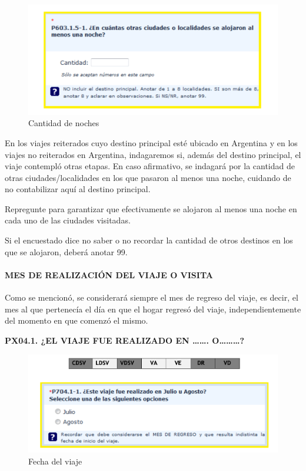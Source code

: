 \documentclass[
  openany]{book}
\begin{document}
\begin{figure}

{\centering \includegraphics[width=1\linewidth]{imagenes/figura6-85} 

}

\caption{Cantidad de noches}\label{fig:menosdeuna5}
\end{figure}

En los viajes reiterados cuyo destino principal esté ubicado en Argentina y en los viajes no reiterados en Argentina, indagaremos si, además del destino principal, el viaje contempló otras etapas. En caso afirmativo, se indagará por la cantidad de otras ciudades/localidades en los que pasaron al menos una noche, cuidando de no contabilizar aquí al destino principal.

Repregunte para garantizar que efectivamente se alojaron al menos una noche en cada uno de las ciudades visitadas.

Si el encuestado dice no saber o no recordar la cantidad de otros destinos en los que se alojaron, deberá anotar 99.

\hypertarget{mes-de-realizaciuxf3n-del-viaje-o-visita}{%
\paragraph{\texorpdfstring{\textbf{MES DE REALIZACIÓN DEL VIAJE O VISITA}}{MES DE REALIZACIÓN DEL VIAJE O VISITA}}\label{mes-de-realizaciuxf3n-del-viaje-o-visita}}

Como se mencionó, se considerará siempre el mes de regreso del viaje, es decir, el mes al que pertenecía el día en que el hogar regresó del viaje, independientemente del momento en que comenzó el mismo.

\textbf{PX04.1. ¿EL VIAJE FUE REALIZADO EN \ldots\ldots. O\ldots\ldots\ldots?}

\begin{figure}

{\centering \includegraphics[width=1\linewidth]{imagenes/figura6-86} 

}

\caption{Fecha del viaje}\label{fig:date}
\end{figure}
\end{document}
